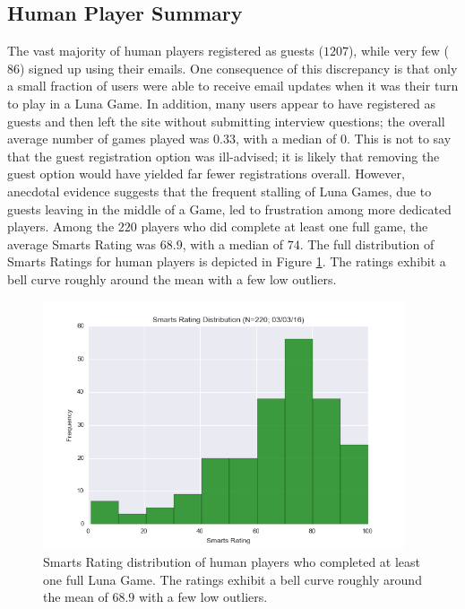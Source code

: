 \subsection{Human Player Summary}

The vast majority of human players registered as guests ($1207$), while very few ($86$) signed up using their emails. One consequence of this discrepancy is that only a small fraction of users were able to receive email updates when it was their turn to play in a Luna Game. In addition, many users appear to have registered as guests and then left the site without submitting interview questions; the overall average number of games played was $0.33$, with a median of $0$. This is not to say that the guest registration option was ill-advised; it is likely that removing the guest option would have yielded far fewer registrations overall. However, anecdotal evidence suggests that the frequent stalling of Luna Games, due to guests leaving in the middle of a Game, led to frustration among more dedicated players. Among the $220$ players who did complete at least one full game, the average Smarts Rating was $68.9$, with a median of $74$. The full distribution of Smarts Ratings for human players is depicted in Figure \ref{humansmartsratings}. The ratings exhibit a bell curve roughly around the mean with a few low outliers. 


\begin{figure}
\includegraphics[width=0.95\textwidth]{figures/ratingDistribution.png}
\caption{\label{humansmartsratings} Smarts Rating distribution of human players who completed at least one full Luna Game. The ratings exhibit a bell curve roughly around the mean of $68.9$ with a few low outliers.}
\end{figure}

